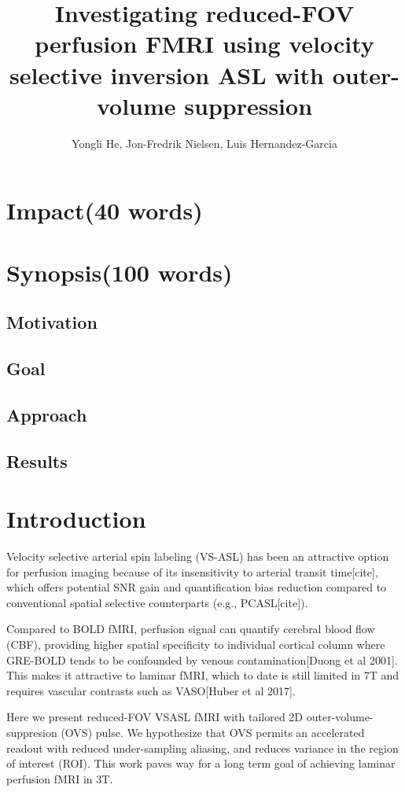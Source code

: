 \documentclass[12pt]{article}
\title{Investigating reduced-FOV perfusion FMRI using 
velocity selective inversion ASL with outer-volume suppression
}
\author{Yongli He, Jon-Fredrik Nielsen, Luis Hernandez-Garcia}
\date{}
\begin{document}
\maketitle
\section{Impact(40 words)}


\section{Synopsis(100 words)}
\subsection{Motivation}

\subsection{Goal}

\subsection{Approach}

\subsection{Results}


\newpage
\section{Introduction}
Velocity selective arterial spin labeling (VS-ASL) has been an attractive option 
for perfusion imaging because of its insensitivity to arterial transit time[cite],
which offers potential SNR gain and quantification bias reduction
compared to conventional spatial selective counterparts (e.g., PCASL[cite]).

Compared to BOLD fMRI, perfusion signal can quantify cerebral blood flow (CBF), 
providing higher spatial specificity to individual cortical column 
where GRE-BOLD tends to be confounded by venous contamination[Duong et al 2001].
This makes it attractive to laminar fMRI,
which to date is still limited in 7T and requires 
vascular contrasts such as VASO[Huber et al 2017].

Here we present reduced-FOV VSASL fMRI with 
tailored 2D outer-volume-suppresion (OVS) pulse. 
We hypothesize that OVS permits an accelerated readout with reduced under-sampling aliasing,
and reduces variance in the region of interest (ROI).
This work paves way for a long term goal of 
achieving laminar perfusion fMRI in 3T. 
\end{document}
